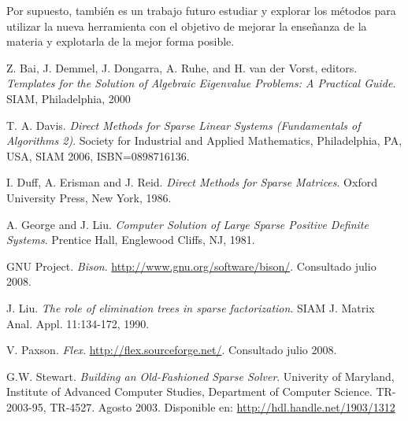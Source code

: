 \documentclass{cacic06}
\begin{document}
Por supuesto, también es un trabajo futuro  estudiar y explorar los métodos para utilizar la nueva herramienta con el objetivo de mejorar la enseñanza de la materia y explotarla de la mejor forma posible.


\appendix

\begin{thebibliography}{99}

 Z. Bai, J. Demmel, J. Dongarra, A. Ruhe, and H. van der Vorst, editors. \textit{Templates for the Solution of Algebraic Eigenvalue Problems: A Practical Guide}. SIAM, Philadelphia, 2000

 T. A. Davis. \textit{Direct Methods for Sparse Linear Systems (Fundamentals of Algorithms 2)}.
Society for Industrial and Applied Mathematics, Philadelphia, PA, USA, SIAM 2006, ISBN=0898716136. 

 I. Duff, A. Erisman and J. Reid.  \textit{Direct Methods for Sparse Matrices}. 
 Oxford University Press, New York, 1986. 

 A. George and J. Liu. 	\textit{Computer Solution of Large Sparse Positive Definite Systems}.
  Prentice Hall, Englewood Cliffs, NJ, 1981.

 GNU Project. \textit{Bison}. \url{http://www.gnu.org/software/bison/}. Consultado julio 2008.

   J. Liu. \textit{ The role of elimination trees in sparse factorization}.
 SIAM J. Matrix Anal. Appl. 11:134-172, 1990. 

 V. Paxson. \textit{Flex}. \url{http://flex.sourceforge.net/}. Consultado julio 2008.

 G.W. Stewart. \textit{Building an Old-Fashioned Sparse Solver}.
Univerity of Maryland, Institute of Advanced Computer Studies, Department of Computer Science.
TR-2003-95, TR-4527. Agosto 2003. Disponible en: \url{http://hdl.handle.net/1903/1312}


\end{thebibliography}
\end{document}
